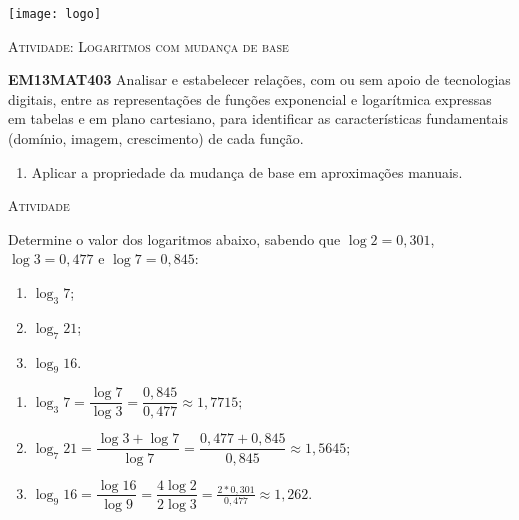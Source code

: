 \documentclass[10 pt,usenames,dvipsnames, oneside]{article}
\begin{document}
\begin{center}
  \begin{minipage}[l]{3cm}
\texttt{[image: logo]}    
\end{minipage}\hfill
\begin{minipage}[r]{.8\textwidth}
 {\Large \scshape Atividade: Logaritmos com mudança de base}  
\end{minipage}
\end{center}
\vspace{.2cm}

\ifdefined\prof
\begin{objetivos}
\item \textbf{EM13MAT403} Analisar e estabelecer relações, com ou sem apoio de tecnologias digitais, entre as representações de funções exponencial e logarítmica expressas em tabelas e em plano cartesiano, para identificar as características fundamentais (domínio, imagem, crescimento) de cada função.
\end{objetivos}

\begin{goals}
\begin{enumerate}
\item Aplicar a propriedade da mudança de base em aproximações manuais.
\end{enumerate}

\end{goals}

\bigskip
\begin{center}
{\large \scshape Atividade}
\end{center}
\fi

Determine o valor dos logaritmos abaixo, sabendo que $\log 2 = 0{,}301$, $\log 3 = 0{,}477$ e $\log 7 = 0{,}845$:
\begin{enumerate}
\item $\log_3 7$;
\item $\log_7 21$;
\item $\log_9 16$.
\end{enumerate}

\ifdefined\prof
\begin{solucao}

\begin{enumerate}
	\item  $\log_3 7=\dfrac{\log 7}{\log 3} = \dfrac{0{,}845}{0{,}477} \approx 1{,}7715;$
	\item  $\log_7 21=\dfrac{\log 3 + \log 7}{\log 7} = \dfrac{0{,}477 + 0{,}845}{0{,}845} \approx 1{,}5645;$
	\item  $\log_9 16=\dfrac{\log 16}{\log 9} =\dfrac{4\log 2}{2\log 3} = \frac{2*0{,}301}{0{,}477} \approx 1{,}262.$
	\end{enumerate}

\end{solucao}
\fi
\end{document}
